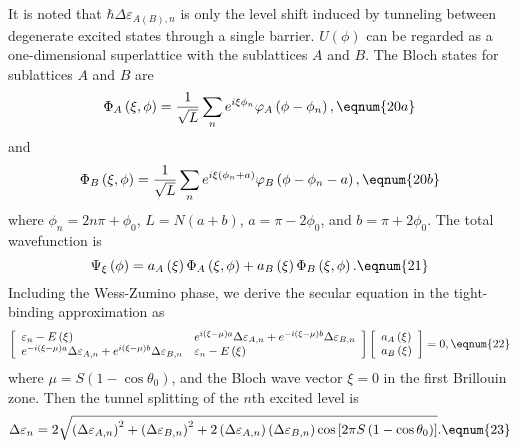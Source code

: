 It is noted that $\hbar \Delta \varepsilon _{A\left( B\right) ,n}$ is only
the level shift induced by tunneling between degenerate excited states
through a single barrier. $U\left( \phi \right) $ can be regarded as a
one-dimensional superlattice with the sublattices $A$ and $B$. The Bloch
states for sublattices $A$ and $B$ are 
\begin{equation}
\Phi _A\left( \xi ,\phi \right) =\frac 1{\sqrt{L}}\sum_ne^{i\xi \phi
_n}\varphi _A\left( \phi -\phi _n\right) ,  \eqnum{20a}
\end{equation}
and 
\begin{equation}
\Phi _B\left( \xi ,\phi \right) =\frac 1{\sqrt{L}}\sum_ne^{i\xi \left( \phi
_n+a\right) }\varphi _B\left( \phi -\phi _n-a\right) ,  \eqnum{20b}
\end{equation}
where $\phi _n=2n\pi +\phi _0$, $L=N\left( a+b\right) $, $a=\pi -2\phi _0$,
and $b=\pi +2\phi _0$. The total wavefunction is 
\begin{equation}
\Psi _\xi \left( \phi \right) =a_A\left( \xi \right) \Phi _A\left( \xi ,\phi
\right) +a_B\left( \xi \right) \Phi _B\left( \xi ,\phi \right) .  \eqnum{21}
\end{equation}
Including the Wess-Zumino phase, we derive the secular equation in the
tight-binding approximation as 
\begin{equation}
\left[ 
\begin{array}{ll}
\varepsilon _n-E\left( \xi \right) & e^{i\left( \xi -\mu \right) a}\Delta
\varepsilon _{A,n}+e^{-i\left( \xi -\mu \right) b}\Delta \varepsilon _{B,n}
\\ 
e^{-i\left( \xi -\mu \right) a}\Delta \varepsilon _{A,n}+e^{i\left( \xi -\mu
\right) b}\Delta \varepsilon _{B,n} & \varepsilon _n-E\left( \xi \right)
\end{array}
\right] \left[ 
\begin{array}{l}
a_A\left( \xi \right) \\ 
a_B\left( \xi \right)
\end{array}
\right] =0,  \eqnum{22}
\end{equation}
where $\mu =S\left( 1-\cos \theta _0\right) $, and the Bloch wave vector $%
\xi =0$ in the first Brillouin zone. Then the tunnel splitting of the $n$th
excited level is 
\begin{equation}
\Delta \varepsilon _n=2\sqrt{\left( \Delta \varepsilon _{A,n}\right)
^2+\left( \Delta \varepsilon _{B,n}\right) ^2+2\left( \Delta \varepsilon
_{A,n}\right) \left( \Delta \varepsilon _{B,n}\right) \cos \left[ 2\pi
S\left( 1-\cos \theta _0\right) \right] }.  \eqnum{23}
\end{equation}
